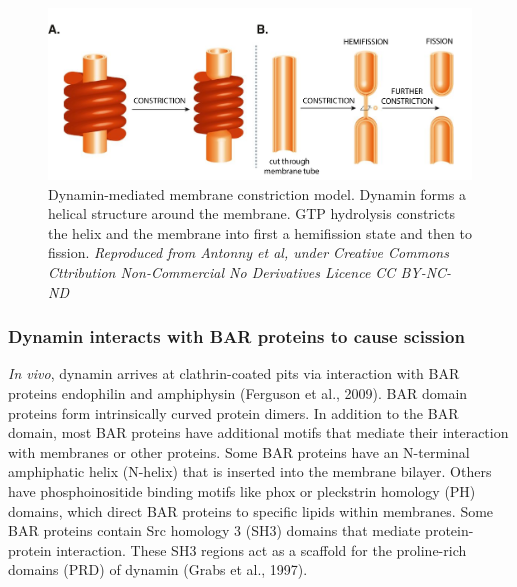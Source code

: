		
	\begin{figure}[H]
			\centering
			\includegraphics[scale=0.545]{figures/intro/dynamin_3}
\caption[Dynamin forms a scaffold]
					{Dynamin-mediated membrane constriction model. Dynamin forms a helical structure around the membrane. GTP hydrolysis constricts the helix and the membrane into first a hemifission state and then to fission.
					\textit{Reproduced from Antonny et al, under Creative Commons Cttribution Non-Commercial No Derivatives Licence CC BY-NC-ND}
		\label{intro_dynamin_scission}}
		\end{figure}



		\subsubsection{Dynamin interacts with BAR proteins to cause scission}
\textit{In vivo}, dynamin arrives at clathrin-coated pits via interaction with BAR proteins endophilin and amphiphysin (Ferguson et al., 2009). BAR domain proteins form intrinsically curved protein dimers. In addition to the BAR domain, most BAR proteins have additional motifs that mediate their interaction with membranes or other proteins. Some BAR proteins have an N-terminal amphiphatic helix (N-helix) that is inserted into the membrane bilayer.  Others have phosphoinositide binding motifs like phox or pleckstrin homology (PH) domains, which direct BAR proteins to specific lipids within membranes. Some BAR proteins contain Src homology 3 (SH3) domains that mediate protein-protein interaction. These SH3 regions act as a scaffold for the proline-rich domains (PRD) of dynamin (Grabs et al., 1997). 



